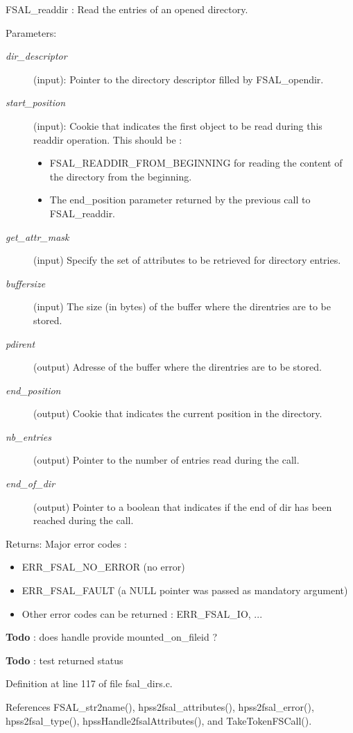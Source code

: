 FSAL\_\-readdir : Read the entries of an opened directory.

\begin{Desc}
\item[Parameters:]
\begin{description}
\item[{\em dir\_\-descriptor}](input): Pointer to the directory descriptor filled by FSAL\_\-opendir. \item[{\em start\_\-position}](input): Cookie that indicates the first object to be read during this readdir operation. This should be :\begin{itemize}
\item FSAL\_\-READDIR\_\-FROM\_\-BEGINNING for reading the content of the directory from the beginning.\item The end\_\-position parameter returned by the previous call to FSAL\_\-readdir. \end{itemize}
\item[{\em get\_\-attr\_\-mask}](input) Specify the set of attributes to be retrieved for directory entries. \item[{\em buffersize}](input) The size (in bytes) of the buffer where the direntries are to be stored. \item[{\em pdirent}](output) Adresse of the buffer where the direntries are to be stored. \item[{\em end\_\-position}](output) Cookie that indicates the current position in the directory. \item[{\em nb\_\-entries}](output) Pointer to the number of entries read during the call. \item[{\em end\_\-of\_\-dir}](output) Pointer to a boolean that indicates if the end of dir has been reached during the call.\end{description}
\end{Desc}
\begin{Desc}
\item[Returns:]Major error codes :\begin{itemize}
\item ERR\_\-FSAL\_\-NO\_\-ERROR (no error)\item ERR\_\-FSAL\_\-FAULT (a NULL pointer was passed as mandatory argument)\item Other error codes can be returned : ERR\_\-FSAL\_\-IO, ... \end{itemize}
\end{Desc}


\begin{Desc}
\item[{\bf Todo}]: does handle provide mounted\_\-on\_\-fileid ? \end{Desc}


\begin{Desc}
\item[{\bf Todo}]: test returned status \end{Desc}


Definition at line 117 of file fsal\_\-dirs.c.

References FSAL\_\-str2name(), hpss2fsal\_\-attributes(), hpss2fsal\_\-error(), hpss2fsal\_\-type(), hpssHandle2fsalAttributes(), and TakeTokenFSCall().